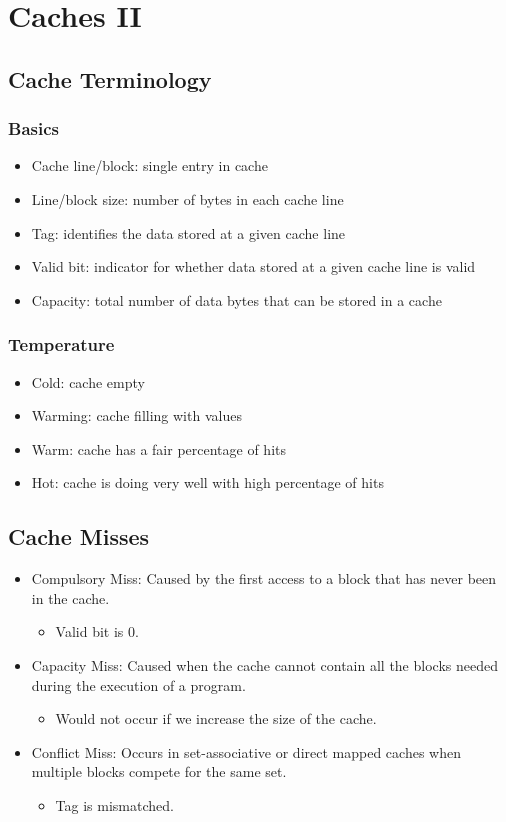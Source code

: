 \chapter{Caches II}

\section{Cache Terminology}
\subsection{Basics}
\begin{itemize}
    \item Cache line/block: single entry in cache
    \item Line/block size: number of bytes in each cache line
    \item Tag: identifies the data stored at a given cache line
    \item Valid bit: indicator for whether data stored at a given cache line is valid
    \item Capacity: total number of data bytes that can be stored in a cache
\end{itemize}

\subsection{Temperature}
\begin{itemize}
    \item Cold: cache empty
    \item Warming: cache filling with values
    \item Warm: cache has a fair percentage of hits
    \item Hot: cache is doing very well with high percentage of hits
\end{itemize}

\section{Cache Misses}
\begin{itemize}
    \item Compulsory Miss: Caused by the first access to a block that has never been in the cache.
     \begin{itemize}
        \item Valid bit is 0.
    \end{itemize}
    \item Capacity Miss: Caused when the cache cannot contain all the blocks needed during the execution of a program.
    \begin{itemize}
        \item Would not occur if we increase the size of the cache.
    \end{itemize}
    \item Conflict Miss: Occurs in set-associative or direct mapped caches when multiple blocks compete for the same set.
    \begin{itemize}
        \item Tag is mismatched.
    \end{itemize}
\end{itemize}

